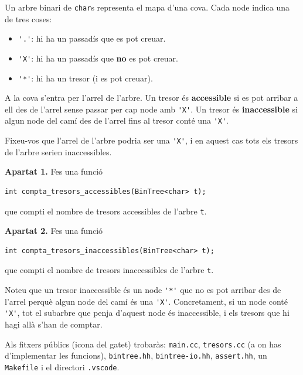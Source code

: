 

\Statement

Un arbre binari de \verb|char|s representa el mapa d'una cova. Cada node indica una de tres coses:

\begin{itemize}
\item \verb|'.'|: hi ha un passadís que es pot creuar.
\item \verb|'X'|: hi ha un passadís que \textbf{no} es pot creuar.
\item \verb|'*'|: hi ha un tresor (i es pot creuar).
\end{itemize}

\medskip

A la cova s'entra per l'arrel de l'arbre. Un tresor és \textbf{accessible} si es pot arribar a ell des de l'arrel sense passar per cap node amb \verb|'X'|. Un tresor és \textbf{inaccessible} si algun node del camí des de l'arrel fins al tresor conté una \verb|'X'|.

\medskip

Fixeu-vos que l'arrel de l'arbre podria ser una \verb|'X'|, i en aquest cas tots els tresors de l'arbre serien inaccessibles.

\medskip

\textbf{Apartat 1.} Fes una funció

\begin{verbatim}
int compta_tresors_accessibles(BinTree<char> t);
\end{verbatim}

que compti el nombre de tresors accessibles de l'arbre \verb|t|.

\medskip

\textbf{Apartat 2.} Fes una funció

\begin{verbatim}
int compta_tresors_inaccessibles(BinTree<char> t);
\end{verbatim}

que compti el nombre de tresors inaccessibles de l'arbre \verb|t|.

\medskip

Noteu que un tresor inaccessible és un node \verb|'*'| que no es pot arribar des de l'arrel perquè algun node del camí és una \verb|'X'|. Concretament, si un node conté \verb|'X'|, tot el subarbre que penja d'aquest node és inaccessible, i els tresors que hi hagi allà s'han de comptar.

\Observation

Als fitxers públics (icona del gatet) trobaràs: \verb|main.cc|, \verb|tresors.cc| (a on has d'implementar les funcions), \verb|bintree.hh|, \verb|bintree-io.hh|, \verb|assert.hh|, un \verb|Makefile| i el directori \verb|.vscode|.

